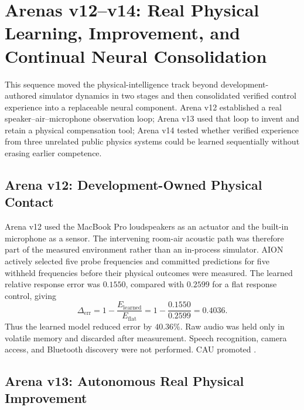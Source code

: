 \section{Arenas v12--v14: Real Physical Learning, Improvement, and Continual Neural Consolidation}
\label{sec:arenas-v12-v14-physical-neural}

This sequence moved the physical-intelligence track beyond development-authored
simulator dynamics in two stages and then consolidated verified control
experience into a replaceable neural component.  Arena v12 established a real
speaker--air--microphone observation loop; Arena v13 used that loop to invent
and retain a physical compensation tool; Arena v14 tested whether verified
experience from three unrelated public physics systems could be learned
sequentially without erasing earlier competence.

\subsection{Arena v12: Development-Owned Physical Contact}

Arena v12 used the MacBook Pro loudspeakers as an actuator and the built-in
microphone as a sensor.  The intervening room-air acoustic path was therefore
part of the measured environment rather than an in-process simulator.  AION
actively selected five probe frequencies and committed predictions for five
withheld frequencies before their physical outcomes were measured.  The
learned relative response error was $0.1550$, compared with $0.2599$ for a flat
response control, giving
\begin{equation}
 \Delta_{\mathrm{err}}
 =1-\frac{E_{\mathrm{learned}}}{E_{\mathrm{flat}}}
 =1-\frac{0.1550}{0.2599}
 =0.4036 .
\end{equation}
Thus the learned model reduced error by $40.36\%$.  Raw audio was held only in
volatile memory and discarded after measurement.  Speech recognition, camera
access, and Bluetooth discovery were not performed.  CAU promoted
.

\subsection{Arena v13: Autonomous Real Physical Improvement}
\label{subsec:arena-v13-real-improvement}

